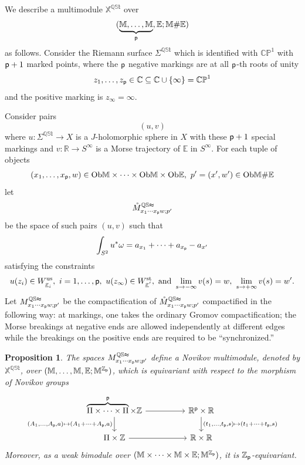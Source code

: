 \documentclass[reqno, 10pt]{amsart}
\numberwithin{equation}{section}
\numberwithin{equation}{section}
\renewcommand{\subset}{\subseteq}
\newtheorem{prop}[thm]{Proposition}
\theoremstyle{definition}
\theoremstyle{remark}
\newcommand{\beq}{\begin{equation}}
\newcommand{\eeq}{\end{equation}}
\newcommand{\beqn}{\begin{equation*}}
\newcommand{\eeqn}{\end{equation*}}
\newcommand{\mb}{\mathbb}
\newcommand{\p}{{\sf p}}
\newcommand{\zp}{{{\mb Z}_{\sf p}}}
\newcommand{\ep}{{{\mathbb E}}}
\newcommand{\uds}[1]{\underline{\smash{#1}}}
\begin{document}
We describe a multimodule ${\mb X}^{\mb{QSt}}$ over 
\beqn
(\underbrace{\mb{M}, \ldots, \mb{M}}_{\p}, {\mb E}; {\mb M}\# {\mb E})
\eeqn
as follows. Consider the Riemann surface $\Sigma^{\mb{QSt}}$ which is identified with $\mb{CP}^1$ with $\p+1$ marked points, where the $\p$ negative markings are at all $\p$-th roots of unity 
\beqn
z_1, \ldots, z_\p \in {\mb C} \subset {\mb C} \cup \{\infty\} = \mb{CP}^1
\eeqn
and the positive marking is $z_\infty = \infty$.

Consider pairs
\beqn
(u, v)
\eeqn
where $u: \Sigma^{\mb{QSt}} \to X$ is a $J$-holomorphic sphere in $X$ with these $\p +1$ special markings and $v: {\mb R} \to S^\infty$ is a Morse trajectory of $\ep$ in $S^\infty$.  For each tuple of objects 
\beqn
(x_1, \ldots, x_\p, w) \in {\rm Ob}{\mb M}\times \cdots \times {\rm Ob}{\mb M}\times {\rm Ob}{\mb E},\ p' = (x', w') \in {\rm Ob}{\mb M}\# {\mb E}
\eeqn
let
\beqn
\mathring M_{x_1 \cdots x_\p w;p'}^{\mb{QSt}}
\eeqn
be the space of such pairs $(u, v)$ such that 
\beqn
\int_{S^2} u^* \omega =  a_{x_1} + \cdots + a_{x_\p} - a_{x'}
\eeqn
satisfying the constraints
\beqn
u(z_i) \in W^{\rm us}_{\uds x_i},\ i = 1, \ldots, \p,\ u(z_\infty) \in W^{\rm st}_{{\uds x}'},\ {\rm and}\ \lim_{s \to -\infty} v(s) = w,\ \lim_{s \to +\infty} v(s) = w'.
\eeqn
Let $M_{x_1 \cdots x_\p w; p'}^{\mb{QSt}}$ be the compactification of $\mathring M_{x_1 \cdots x_\p w; p'}^{\mb{QSt}}$ compactified in the following way: at markings, one takes the ordinary Gromov compactification; the Morse breakings at negative ends are allowed independently at different edges while the breakings on the positive ends are required to be ``synchronized.''


\begin{prop}
The spaces $M_{x_1 \cdots x_\p w; p'}^{\mb{QSt}}$ define a Novikov multimodule, denoted by ${\mb X}^{\mb{QSt}}$, over $({\mb M}, \ldots, {\mb M}, \ep; {\mb M}^\zp)$, which is equivariant with respect to the morphism of Novikov groups
\beq\label{eqn201}
\begin{tikzcd}
\overbrace{\Pi \times \cdots \times \Pi}^{\p} \times {\mb Z} \arrow[rr] \arrow[d, "{(A_1, \ldots, A_{\p}, a) \mapsto (A_1 + \cdots + A_{\p}, a)}"'] & & {\mb R}^{\p} \times {\mb R} \arrow[d, "{(t_1, \ldots, t_{\p}, s) \mapsto (t_1 + \cdots + t_{\p}, s)}"] \\
\Pi \times {\mb Z} \arrow[rr] & & {\mb R} \times {\mb R}
\end{tikzcd}
\eeq
Moreover, as a weak bimodule over $({\mb M}\times \cdots \times {\mb M} \times \ep; \mb{M}^\zp)$, it is $\zp$-equivariant. 
\end{prop}
\end{document}
